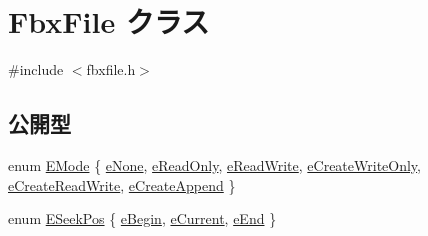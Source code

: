 \hypertarget{class_fbx_file}{}\section{Fbx\+File クラス}
\label{class_fbx_file}


{\ttfamily \#include $<$fbxfile.\+h$>$}

\subsection*{公開型}
\begin{DoxyCompactItemize}
\item 
enum \hyperlink{class_fbx_file_a0370e8fd17b3658f718e1350a6a6f462}{E\+Mode} \{ \newline
\hyperlink{class_fbx_file_a0370e8fd17b3658f718e1350a6a6f462a176e2ccdd9e671698ea8f6f16e41d906}{e\+None}, 
\hyperlink{class_fbx_file_a0370e8fd17b3658f718e1350a6a6f462a7b582fd52d7c01e076ef4d30d3ca7151}{e\+Read\+Only}, 
\hyperlink{class_fbx_file_a0370e8fd17b3658f718e1350a6a6f462a6210f903e353d976f304563453cf34da}{e\+Read\+Write}, 
\hyperlink{class_fbx_file_a0370e8fd17b3658f718e1350a6a6f462ae329198f644b68a3bbf655309eff07c9}{e\+Create\+Write\+Only}, 
\newline
\hyperlink{class_fbx_file_a0370e8fd17b3658f718e1350a6a6f462afce41267d2567926e7983b1193991a49}{e\+Create\+Read\+Write}, 
\hyperlink{class_fbx_file_a0370e8fd17b3658f718e1350a6a6f462a7b54172ce9f59ecc1746a4b6df0a064e}{e\+Create\+Append}
 \}
\item 
enum \hyperlink{class_fbx_file_aba91fe59f9c0a4c84a92f13c0c27deec}{E\+Seek\+Pos} \{ \hyperlink{class_fbx_file_aba91fe59f9c0a4c84a92f13c0c27deeca7a474ae0aa6f46b8becdfe54208f928e}{e\+Begin}, 
\hyperlink{class_fbx_file_aba91fe59f9c0a4c84a92f13c0c27deecaf2653dc9849e794feee37a015d80b098}{e\+Current}, 
\hyperlink{class_fbx_file_aba91fe59f9c0a4c84a92f13c0c27deeca1ab3eb84e8694fd4e63d0c864b12508d}{e\+End}
 \}
\end{DoxyCompactItemize}
